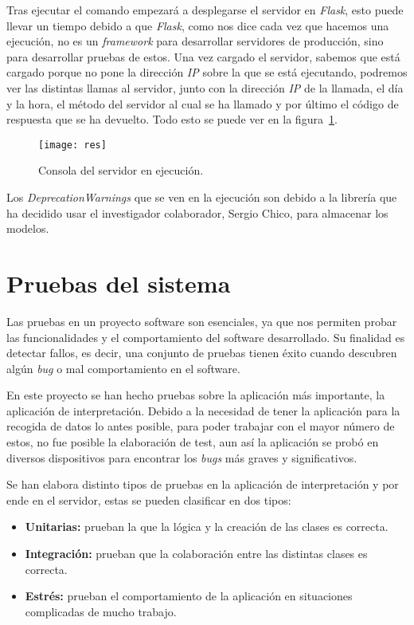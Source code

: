 Tras ejecutar el comando empezará a desplegarse el servidor en \textit{Flask}, esto puede llevar un tiempo debido a que \textit{Flask}, como nos dice cada vez que hacemos una ejecución, no es un \textit{framework} para desarrollar servidores de producción, sino para desarrollar pruebas de estos. Una vez cargado el servidor, sabemos que está cargado porque no pone la dirección \textit{IP} sobre la que se está ejecutando, podremos ver las distintas llamas al servidor, junto con la dirección \textit{IP} de la llamada, el día y la hora, el método del servidor al cual se ha llamado y por último el código de respuesta que se ha devuelto. Todo esto se puede ver en la figura~\ref{fig:res}.

\begin{figure}
	\centering
	\texttt{[image: res]}
	\caption{Consola del servidor en ejecución.}
	\label{fig:res}
\end{figure}

Los \textit{DeprecationWarnings} que se ven en la ejecución son debido a la librería que ha decidido usar el investigador colaborador, Sergio Chico, para almacenar los modelos.
\section{Pruebas del sistema}
Las pruebas en un proyecto software son esenciales, ya que nos permiten probar las funcionalidades y el comportamiento del software desarrollado. Su finalidad es detectar fallos, es decir, una conjunto de pruebas tienen éxito cuando descubren algún \textit{bug} o mal comportamiento en el software.

En este proyecto se han hecho pruebas sobre la aplicación más importante, la aplicación de interpretación. Debido a la necesidad de tener la aplicación para la recogida de datos lo antes posible, para poder trabajar con el mayor número de estos, no fue posible la elaboración de test, aun así la aplicación se probó en diversos dispositivos para encontrar los \textit{bugs} más graves y significativos.

Se han elabora distinto tipos de pruebas en la aplicación de interpretación y por ende en el servidor, estas se pueden clasificar en dos tipos:
\begin{itemize}
	\item \textbf{Unitarias:} prueban la que la lógica y la creación de las clases es correcta.
	\item \textbf{Integración:} prueban que la colaboración entre las distintas clases es correcta.
	\item \textbf{Estrés:} prueban el comportamiento de la aplicación en situaciones complicadas de mucho trabajo.
\end{itemize}

